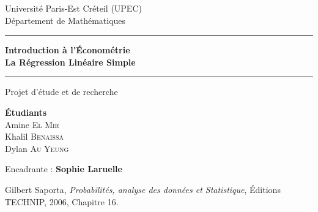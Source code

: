 \documentclass[12pt,a4paper]{article}
\theoremstyle{definition}
\theoremstyle{remark}
\begin{document}
\renewcommand{\contentsname}{Table des matières}
\renewcommand{\refname}{Références}




\begin{titlepage}
  \centering
  \vspace*{1.5cm}

  {\Large Université Paris-Est Créteil (UPEC)\\
  Département de Mathématiques\par}

  \vspace{0.8cm}
  \rule{12cm}{0.8pt}
  \vspace{0.8cm}

  {\LARGE\bfseries\color{deepblue}
    Introduction à l'Économétrie\\[0.4em]
    La Régression Linéaire Simple\par}

  \vspace{0.5cm}
  \rule{12cm}{0.8pt}
  \vspace{1cm}

  {\large Projet d'étude et de recherche\par}
  \vspace{0.8cm}

  \begin{tcolorbox}[colback=white, colframe=deepblue!60, width=9cm]
    \centering
    {\normalsize\bfseries Étudiants}\\\vspace{0.4em}
    {\normalsize Amine \textsc{El Mir}}\\[0.2em]
    {\normalsize Khalil \textsc{Benaissa}}\\[0.2em]
    {\normalsize Dylan \textsc{Au Yeung}}
  \end{tcolorbox}

  \vspace{0.6cm}
  {\large Encadrante : \textbf{Sophie Laruelle}\par}

  \vspace{1cm}
  \begin{tcolorbox}[colback=deepblue!5, colframe=deepblue, width=12cm,
                    title={\small\bfseries Référence bibliographique principale}]
    \small Gilbert Saporta, \textit{Probabilités, analyse des données et Statistique},
    Éditions TECHNIP, 2006, Chapitre 16.
  \end{tcolorbox}

  \vfill
\end{titlepage}
\end{document}
